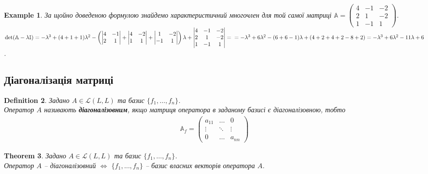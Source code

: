 \documentclass[a4paper, 10pt]{article}
\theoremstyle{theoremdd}
\newtheorem{theorem}{Theorem}[subsection]
\newtheorem{definition}[theorem]{Definition}
\newtheorem{example}[theorem]{Example}
\begin{document}
\begin{example}
За щойно доведеною формулою знайдемо характеристичний многочлен для той самої матриці $\mathbb{A} = \begin{pmatrix}
4 & -1 & -2 \\
2 & 1 & -2 \\
1 & -1 & 1
\end{pmatrix}$.\\
$\det (\mathbb{A} - \lambda \mathbb{I}) = -\lambda^3 + (4+1+1)\lambda^2 - \left( \begin{vmatrix}
4 & -1 \\
2 & 1
\end{vmatrix} + \begin{vmatrix}
4 & -2 \\
1 & 1
\end{vmatrix} + \begin{vmatrix}
1 & -2 \\
-1 & 1
\end{vmatrix} \right) \lambda + \begin{vmatrix}
4 & -1 & -2 \\
2 & 1 & -2 \\
1 & -1 & 1
\end{vmatrix} = \\
=-\lambda^3 + 6\lambda^2 - (6+6-1)\lambda + (4+2+4+2-8+2) = -\lambda^3 + 6\lambda^2 -11\lambda + 6$.
\end{example}

\subsection{Діагоналізація матриці}
\begin{definition}
Задано $A \in \mathcal{L}(L,L)$ та базис $\{f_1,\dots,f_n\}$.\\
Оператор $A$ називають \textbf{діагоналізовним}, якщо матриця оператора в заданому базисі є діагоналізовною, тобто
\begin{align*}
\mathbb{A}_f = \begin{pmatrix}
a_{11} & \dots & 0 \\
\vdots & \ddots & \vdots \\
0 & \dots & a_{nn}
\end{pmatrix}
\end{align*}
\end{definition}

\begin{theorem}
Задано $A \in \mathcal{L}(L,L)$ та базис $\{f_1,\dots,f_n\}$.\\
Оператор $A$ -- діагоналізовний $\iff$ $\{f_1,\dots,f_n\}$ -- базис власних векторів оператора $A$.
\end{theorem}
\end{document}
